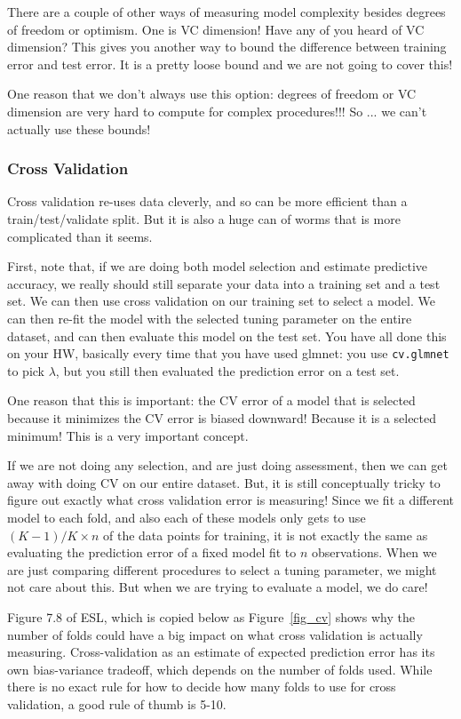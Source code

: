 There are a couple of other ways of measuring model complexity besides degrees of freedom or optimism. One is VC dimension! Have any of you heard of VC dimension? This gives you another way to bound the difference between training error and test error. It is a pretty loose bound and we are not going to cover this!

One reason that we don't always use this option: degrees of freedom or VC dimension are very hard to compute for complex procedures!!! So ... we can't actually use these bounds!

\subsubsection{Cross Validation}

Cross validation re-uses data cleverly, and so can be more efficient than a train/test/validate split. But it is also a huge can of worms that is more complicated than it seems.  

First, note that, if we are doing both model selection and estimate predictive accuracy, we really should still separate your data into a training set and a test set. We can then use cross validation on our training set to select a model. We can then re-fit the model with the selected tuning parameter on the entire dataset, and can then evaluate this model on the test set. You have all done this on your HW, basically every time that you have used glmnet: you use \texttt{cv.glmnet} to pick $\lambda$, but you still then evaluated the prediction error on a test set.

One reason that this is important: the CV error of a model that is selected because it minimizes the CV error is biased downward! Because it is a selected minimum! This is a very important concept. 

If we are not doing any selection, and are just doing assessment, then we can get away with doing CV on our entire dataset. But, it is still conceptually tricky to figure out exactly what cross validation error is measuring! Since we fit a different model to each fold, and also each of these models only gets to use $(K-1)/K \times n$ of the data points for training, it is not exactly the same as evaluating the prediction error of a fixed model fit to $n$ observations. When we are just comparing different procedures to select a tuning parameter, we might not care about this. But when we are trying to evaluate a model, we do care! 

Figure 7.8 of ESL, which is copied below as Figure~\ref{fig_cv} shows why the number of folds could have a big impact on what cross validation is actually measuring. Cross-validation as an estimate of expected prediction error has its own bias-variance tradeoff, which depends on the number of folds used. While there is no exact rule for how to decide how many folds to use for cross validation, a good rule of thumb is 5-10.  

